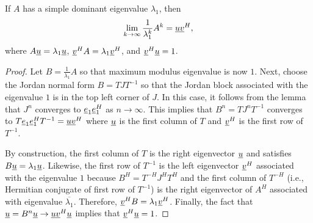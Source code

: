 \begin{theorem}
If $A$ has a simple dominant eigenvalue $\lambda_1$, then
\[ \lim_{k\rightarrow \infty} \frac{1}{\lambda_1^k} A^k = \underline{u} \underline{v}^H, \]
where $A \underline{u} = \lambda_1 \underline{u}$, $\underline{v}^H A = \lambda_1 \underline{v}^H$, and $\underline{v}^H \underline{u} = 1$.
\end{theorem}
\begin{proof}
Let $B = \frac{1}{\lambda_1} A$ so that maximum modulus eigenvalue is now $1$.
Next, choose the Jordan normal form $B = T J T^{-1}$ so that the Jordan block associated with the eigenvalue $1$ is in the top left corner of $J$.
In this case, it follows from the lemma that $J^n$ converges to $\underline{e}_1 \underline{e}_1^H$ as $n\rightarrow \infty$.
This implies that $B^n = T J^n T^{-1}$ converges to $T \underline{e}_1 \underline{e}_1^H T^{-1} = \underline{u} \underline{v}^H$ where $\underline{u}$ is the first column of $T$ and $\underline{v}^H$ is the first row of $T^{-1}$.

By construction, the first column of $T$ is the right eigenvector $\underline{u}$ and satisfies $B \underline{u} = \lambda_1 \underline{u}$.
Likewise, the first row of $T^{-1}$ is the left eigenvector $\underline{v}^H$ associated with the eigenvalue $1$ because $B^H = T^{-H} J^H T^H$ and the first column of $T^{-H}$ (i.e., Hermitian conjugate of first row of $T^{-1}$) is the right eigenvector of $A^H$ associated with eigenvalue $\overline{\lambda_1}$.
Therefore, $\underline{v}^H B = \lambda_1 \underline{v}^H$.
Finally, the fact that $\underline{u} = B^n \underline{u} \rightarrow \underline{u} \underline{v}^H \underline{u}$ implies that $\underline{v}^H \underline{u} = 1$.
\end{proof}



